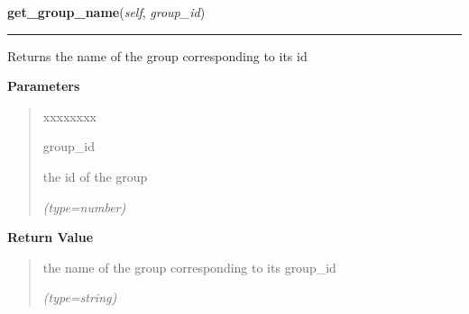 \hspace{.8\funcindent}\begin{boxedminipage}{\funcwidth}

    \raggedright \textbf{get\_group\_name}(\textit{self}, \textit{group\_id})

    \vspace{-1.5ex}

    \rule{\textwidth}{0.5\fboxrule}
\setlength{\parskip}{2ex}
    Returns the name of the group corresponding to its id

\setlength{\parskip}{1ex}
      \textbf{Parameters}
      \vspace{-1ex}

      \begin{quote}
        \begin{Ventry}{xxxxxxxx}

          \item[group\_id]

          the id of the group

            {\it (type=number)}

        \end{Ventry}

      \end{quote}

      \textbf{Return Value}
    \vspace{-1ex}

      \begin{quote}
      the name of the group corresponding to its group\_id

      {\it (type=string)}

      \end{quote}

    \end{boxedminipage}

    \label{DBE:DBE:get_group_id}

    \vspace{0.5ex}

